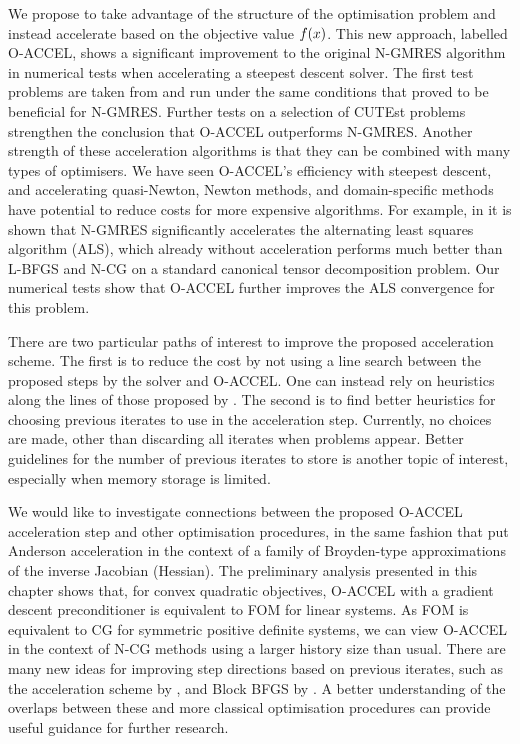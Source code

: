\documentclass[main.tex]{subfiles}
\begin{document}
We propose to take advantage of the structure of the optimisation
problem and instead accelerate based on the objective value
$f(x)$.  This new approach, labelled O-ACCEL, shows a significant
improvement to the original N-GMRES algorithm in numerical tests when
accelerating a steepest descent solver. The first test problems are
taken from \citet{sterck2013steepest} and run under the same
conditions that proved to be beneficial for N-GMRES.  Further tests on
a selection of CUTEst problems strengthen the conclusion that O-ACCEL
outperforms N-GMRES.  Another strength of these acceleration
algorithms is that they can be combined with many types of
optimisers. We have seen O-ACCEL's efficiency with steepest descent,
and accelerating quasi-Newton, Newton methods, and domain-specific
methods have potential to reduce costs for more expensive algorithms.
For example, in \citet{sterck2013steepest} it is shown that N-GMRES
significantly accelerates the alternating least squares algorithm
(ALS), which already without acceleration performs much better than
L-BFGS and N-CG on a standard canonical tensor decomposition
problem. Our numerical tests show that O-ACCEL further improves the
ALS convergence for this problem.

There are two particular paths of interest to improve the proposed
acceleration scheme. The first is to reduce the cost by not using a
line search between the proposed steps by the solver and O-ACCEL. One
can instead rely on heuristics along the lines of those proposed by
\citet{washio1997krylov}.  The second is to find better heuristics for
choosing previous iterates to use in the acceleration step. Currently,
no choices are made, other than discarding all iterates when problems
appear.  Better guidelines for the number of previous iterates to
store is another topic of interest, especially when memory storage is
limited.

We would like to investigate connections between the proposed O-ACCEL
acceleration step and other optimisation procedures, in the same
fashion that \citet{fang2009two} put Anderson acceleration in the
context of a family of Broyden-type approximations of the inverse
Jacobian (Hessian).  The preliminary analysis presented in this
chapter shows that, for convex quadratic objectives, O-ACCEL with a
gradient descent preconditioner is equivalent to FOM for linear
systems. As FOM is equivalent to CG for symmetric positive definite
systems, we can view O-ACCEL in the context of N-CG methods using a
larger history size than usual.  There are many new ideas for
improving step directions based on previous iterates, such as the
acceleration scheme by \citet{damien2016regularized}, and Block BFGS
by \citet{gao2016block}.  A better understanding of the overlaps
between these and more classical optimisation procedures can provide
useful guidance for further research.
\end{document}
